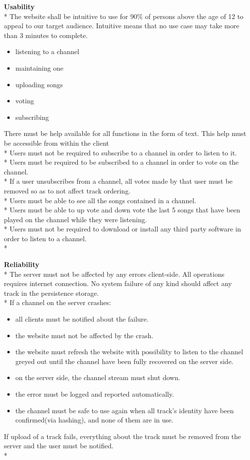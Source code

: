 \documentclass[a4paper,11pt,report]{article}
\begin{document}
\textbf{Usability} \\*
The website shall be intuitive to use for 90\% of persons above the age of 12 to appeal to our target audience. Intuitive means that no use case may take more than 3 minutes to complete.
\begin{itemize}
\item listening to a channel
\item maintaining one 
\item uploading songs
\item voting
\item subscribing
\end{itemize}

There must be help available for all functions in the form of text. This help must be accessible from within the client \\*
Users must not be required to subscribe to a channel in order to listen to it. \\*
Users must be required to be subscribed to a channel in order to vote on the channel. \\*
If a user unsubscribes from a channel, all votes made by that user must be removed so as to not affect track ordering. \\*
Users must be able to see all the songs contained in a channel. \\*
Users must be able to up vote and down vote the last 5 songs that have been played on the channel while they were listening. \\*
Users must not be required to download or install any third party software in order to listen to a channel. \\*

\textbf{Reliability} \\*
The server must not be affected by any errors client-side. All operations requires internet connection. No system failure of any kind should affect any track in the persistence storage. \\*
If a channel on the server crashes:
\begin{itemize}
\item all clients must be notified about the failure.
\item the website must not be affected by the crash.
\item the website must refresh the website with possibility to listen to the channel greyed out until the channel have been fully recovered on the server side.
\item on the server side, the channel stream must shut down.
\item the error must be logged and reported automatically. 
\item the channel must be safe to use again when all track's identity have been confirmed(via hashing), and none of them are in use.
\end{itemize}
If upload of a track fails, everything about the track must be removed from the server and the user must be notified. \\*
\end{document}
